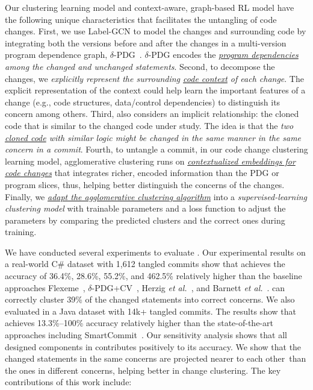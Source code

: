 Our clustering learning model and context-aware, graph-based RL model
have the following unique characteristics that facilitates the
untangling of code changes. First, we use Label-GCN to model the
changes and surrounding code by integrating both the versions before
and after the changes in a multi-version program dependence graph,
$\delta$-PDG~\cite{flexeme-fse20}. $\delta$-PDG encodes the {\em
  \underline{program dependencies} among the changed and unchanged
  statements}. Second, to decompose the changes, we {\em explicitly
  represent the surrounding \underline{code context} of each
  change}. The explicit representation of the context could help
{\tool} learn the important features of a change (e.g., code
structures, data/control dependencies) to distinguish its concern
among others.
%
Third, {\tool} also considers an implicit relationship:
the cloned code that is similar to the changed code under study.
%
The idea is that the {\em two \underline{cloned code} with similar
  logic might be changed in the same manner in the same concern in a
  commit}. Fourth, to untangle a commit, in our code change clustering
learning model, agglomerative clustering runs on {\em
  \underline{contextualized embeddings for code changes}} that integrates richer, encoded information
than the PDG or program slices, thus, helping better distinguish the
concerns of the changes. Finally, we {\em \underline{adapt the
    agglomerative clustering algorithm}} into a {\em
  supervised-learning clustering model} with trainable parameters and
a loss function to adjust the parameters by comparing the predicted
clusters and the correct ones during training.



  We have conducted several experiments to evaluate
    {\tool}. Our experimental results on a real-world C\# dataset with
    1,612 tangled commits show that {\tool} achieves the
    accuracy of 36.4\%, 28.6\%, 55.2\%, and 462.5\% relatively higher
    than the baseline approaches Flexeme~\cite{flexeme-fse20},
    $\delta$-PDG+CV~\cite{flexeme-fse20}, Herzig {\em et
      al.}~\cite{kim-emse16}, and Barnett {\em et
      al.}~\cite{barnett-icse15}. {\tool} can correctly cluster 39\%
    of the changed statements into correct concerns.
%
We also evaluated {\tool} in a Java dataset with 14k+ tangled
commits. The results show that {\tool} achieves 13.3\%--100\% accuracy
relatively higher than the state-of-the-art approaches
including SmartCommit~\cite{smartcommit-fse21}. Our sensitivity analysis
shows that all designed components in {\tool} contributes positively
to its accuracy. We show that the changed statements in the same
concerns are projected nearer to each other~than the ones in different
concerns, helping {\tool} better in change clustering.
The key contributions of this work include:

